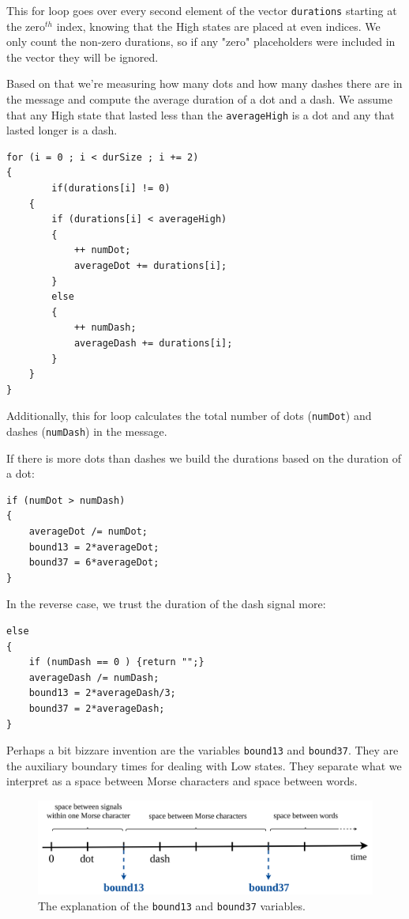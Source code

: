 \documentclass[10pt]{report}
\begin{document}
This for loop goes over every second element of the vector \texttt{durations} starting at the zero$^{th}$ index, knowing that the High states are placed at even indices. We only count the non-zero durations, so if any "zero" placeholders were included in the vector they will be ignored.

Based on that we're measuring how many dots and how many dashes there are in the message and compute the average duration of a dot and a dash. We assume that any High state that lasted less than the \texttt{averageHigh} is a dot and any that lasted longer is a dash.

\begin{lstlisting}
for (i = 0 ; i < durSize ; i += 2)
{
     	if(durations[i] != 0)
	{
		if (durations[i] < averageHigh)
		{
			++ numDot;
			averageDot += durations[i];
		}
		else
		{
			++ numDash;
			averageDash += durations[i];
		}
	}
}
\end{lstlisting}

Additionally, this for loop calculates the total number of dots (\texttt{numDot}) and dashes (\texttt{numDash}) in the message.

\newpage

If there is more dots than dashes we build the durations based on the duration of a dot:

\begin{lstlisting}
if (numDot > numDash)
{
	averageDot /= numDot;
	bound13 = 2*averageDot;
	bound37 = 6*averageDot;
}
\end{lstlisting}

In the reverse case, we trust the duration of the dash signal more:

\begin{lstlisting}
else
{
	if (numDash == 0 ) {return "";}
	averageDash /= numDash;
	bound13 = 2*averageDash/3;
	bound37 = 2*averageDash;
}
\end{lstlisting}

Perhaps a bit bizzare invention are the variables \texttt{bound13} and \texttt{bound37}. They are the auxiliary boundary times for dealing with Low states. They separate what we interpret as a space between Morse characters and space between words.


\begin{figure}[H]
\centering\includegraphics[width=14.5cm]{bound13_37.png}
\caption{The explanation of the \texttt{bound13} and \texttt{bound37} variables.}				
\label{fig:bound}
\end{figure}
\end{document}
